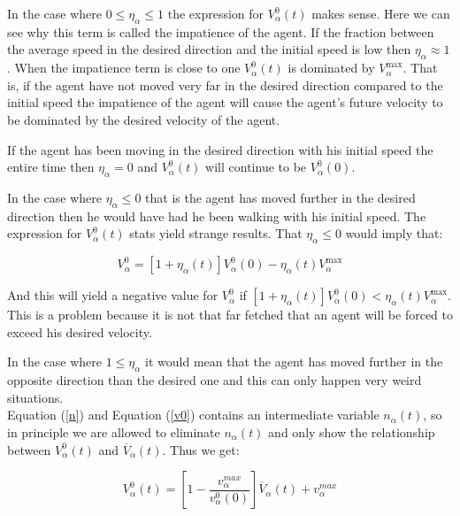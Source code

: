 In the case where $0 \leq \eta_{\alpha} \leq 1$ the expression for 
$V_{\alpha}^{0} \left( t \right)$  makes sense. Here we can see why this term 
is called the impatience of the agent. If the fraction  between the average 
speed in the desired direction and the initial speed is low then $\eta_{\alpha} \approx 1$. 
When the impatience term is close to one $V_{\alpha}^{0} \left( t \right)$ 
is dominated by $V_{\alpha}^{\text{max}}$. That is, if the agent have not 
moved very far in the desired direction compared to the initial speed the 
impatience of the agent will cause the agent's future velocity to be dominated by 
the desired velocity of the agent.

If the agent has been moving in the desired direction with his initial 
speed the entire time then $\eta_{\alpha} = 0$  and 
$V_{\alpha}^{0} \left( t \right)$ will continue to be $V_{\alpha}^{0} \left( 0 \right)$.

In the case where $\eta_{\alpha} \leq 0$ that is the agent has moved further 
in the desired direction then he would have had he been walking with his 
initial speed. The expression for $V_{\alpha}^{0} \left( t \right)$
stats yield strange results. That $\eta_{\alpha} \leq 0$ would imply that:

\begin{equation}
    V_{\alpha}^{0} = \left[ 1 + \eta_{\alpha} \left( t \right) \right] 
    V_{\alpha}^{0} \left( 0 \right) -
    \eta_{\alpha} \left( t \right)V_{\alpha}^{\text{max}}
\end{equation}

And this will yield a negative value for $V_{\alpha}^{0}$ if $\left[ 1 + \eta_{\alpha} \left( t \right) \right] 
V_{\alpha}^{0} \left( 0 \right) < \eta_{\alpha} \left( t \right)V_{\alpha}^{\text{max}}$. 
This is a problem because it is not that far fetched that an agent will be 
forced to exceed his desired velocity.

In the case where $1 \leq \eta_{\alpha}$ it would mean that the agent has moved 
further in the opposite direction than the desired one and this can only happen very 
weird situations.\\

Equation (\ref{n}) and Equation (\ref{v0}) contains an intermediate variable $ n_{\alpha} \left( t \right) $, 
so in principle we are allowed to eliminate $ n_{\alpha} \left( t \right) $ and only show the 
relationship between $ V_{\alpha}^{0}(t) $ and $ \overline{V}_{\alpha} \left( t \right) $. Thus we get:

\begin{equation}\label{vv}
    V_{\alpha}^{0}(t) = \left[ 1 - \frac{v_{\alpha}^{max}}{v_{\alpha}^{0}(0)}\right]\overline{V}_{\alpha} \left( t \right) + v_{\alpha}^{max}
\end{equation}

